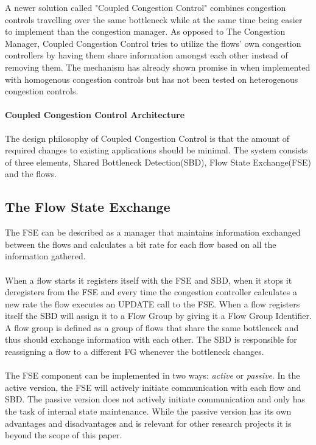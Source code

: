 A newer solution called "Coupled Congestion Control" \cite{rfc8699} combines congestion controls travelling over the same bottleneck while at the same time being easier to implement than the congestion manager.
As opposed to The Congestion Manager, Coupled Congestion Control tries to utilize the flows' own congestion controllers by having them share information amongst each other instead of removing them. 
The mechanism has already shown promise in \cite{10.1145/2740070.2630089, 7502803} when implemented with homogenous congestion controls but has not been tested on heterogenous congestion controls. 
\paragraph{Coupled Congestion Control Architecture}
The design philosophy of Coupled Congestion Control is that the amount of required changes to existing applications should be minimal. 
The system consists of three elements, Shared Bottleneck Detection(SBD), Flow State Exchange(FSE) and the flows. 

\subsection{The Flow State Exchange}
The FSE can be described as a manager that maintains information exchanged between the flows and calculates a bit rate for each flow based on all the information gathered. 
\paragraph{}
When a flow starts it registers itself with the FSE and SBD, when it stops it deregisters from the FSE and every time the congestion controller calculates a new rate the flow executes an UPDATE call to the FSE.
When a flow registers itself the SBD will assign it to a Flow Group by giving it a Flow Group Identifier.
A flow group is defined as a group of flows that share the same bottleneck and thus should exchange information with each other. 
The SBD is responsible for reassigning a flow to a different FG whenever the bottleneck changes.
\paragraph{}
The FSE component can be implemented in two ways: \textit{active} or \textit{passive}.
In the active version, the FSE will actively initiate communication with each flow and SBD. 
The passive version does not actively initiate communication and only has the task of internal state maintenance.
While the passive version has its own advantages and disadvantages and is relevant for other research projects it is beyond the scope of this paper.

